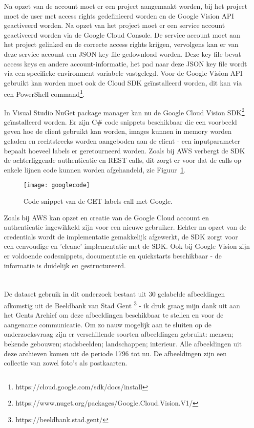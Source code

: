 Na opzet van de account moet er een project aangemaakt worden, bij het project moet de user met access rights gedefinieerd worden en de Google Vision API geactiveerd worden. Na opzet van het project moet er een service account geactiveerd worden via de Google Cloud Console. De service account moet aan het project gelinked en de correcte access rights krijgen, vervolgens kan er van deze service account een JSON key file gedownload worden. Deze key file bevat access keys en andere account-informatie, het pad naar deze JSON key file wordt via een specifieke environment variabele vastgelegd. Voor de Google Vision API gebruikt kan worden moet ook de Cloud SDK geïnstalleerd worden, dit kan via een PowerShell command\footnote{https://cloud.google.com/sdk/docs/install}.

In Visual Studio NuGet package manager kan nu de Google Cloud Vision SDK\footnote{https://www.nuget.org/packages/Google.Cloud.Vision.V1/} geïnstalleerd worden. Er zijn C\# code snippets beschikbaar die een voorbeeld geven hoe de client gebruikt kan worden, images kunnen in memory worden geladen en rechtstreeks worden aangeboden aan de client - een inputparameter bepaalt hoeveel labels er geretourneerd worden. Zoals bij AWS verbergt de SDK de achterliggende authenticatie en REST calls, dit zorgt er voor dat de calls op enkele lijnen code kunnen worden afgehandeld, zie Figuur~\ref{fig:googlecode}.

\begin{figure}
    \centering
    \texttt{[image: googlecode]}
    \caption{Code snippet van de GET labels call met Google.}
    \label{fig:googlecode}
\end{figure}

Zoals bij AWS kan opzet en creatie van de Google Cloud account en authenticatie ingewikkeld zijn voor een nieuwe gebruiker. Echter na opzet van de credentials wordt de implementatie gemakkelijk afgewerkt, de SDK zorgt voor een eenvoudige en 'cleane' implementatie met de SDK. Ook bij Google Vision zijn er voldoende codesnippets, documentatie en quickstarts beschikbaar - de informatie is duidelijk en gestructureerd.

\section{}
\label{sec:methodologie-data}
De dataset gebruik in dit onderzoek bestaat uit 30 gelabelde afbeeldingen afkomstig uit de Beeldbank van Stad Gent \footnote{https://beeldbank.stad.gent/} - ik druk graag mijn dank uit aan het Gents Archief om deze afbeeldingen beschikbaar te stellen en voor de aangename communicatie. Om zo nauw mogelijk aan te sluiten op de onderzoeksvraag zijn er verschillende soorten afbeeldingen gebruikt: mensen; bekende gebouwen; stadsbeelden; landschappen; interieur. Alle afbeeldingen uit deze archieven komen uit de periode 1796 tot nu. De afbeeldingen zijn een collectie van zowel foto's als postkaarten.

